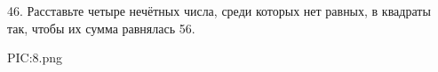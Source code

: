 46. Расставьте четыре нечётных числа, среди которых нет равных, в квадраты так, чтобы их сумма равнялась 56.
\begin{center}
{{PIC:8.png}}
\end{center}
